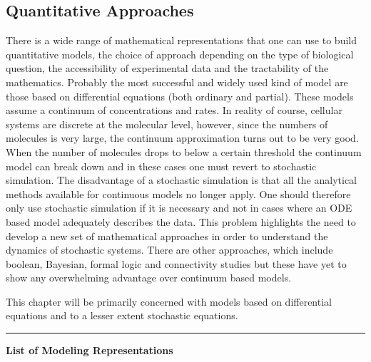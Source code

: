\subsection{Quantitative Approaches}

There is a wide range of mathematical representations that one can use
to build quantitative models, the choice of approach depending on the
type of biological question, the accessibility of experimental data and
the tractability of the mathematics. Probably the most successful and
widely used kind of model are those based on differential equations
(both ordinary and partial). These models assume a continuum of
concentrations and rates. In reality of course, cellular systems are
discrete at the molecular level, however, since the numbers of molecules
is very large, the continuum approximation turns out to be very good.
When the number of molecules drops to below a certain threshold the
continuum model can break down and in these cases one must revert to
stochastic simulation. The disadvantage of a stochastic simulation is
that all the analytical methods available for continuous models no
longer apply. One should therefore only use stochastic simulation if it
is necessary and not in cases where an ODE based model adequately
describes the data. This problem highlights the need to develop a new
set of mathematical approaches in order to understand the dynamics of
stochastic systems. There are other approaches, which include boolean,
Bayesian, formal logic and connectivity studies but these have yet to
show any overwhelming advantage over continuum based models.

This chapter will be primarily concerned with models based on
differential equations and to a lesser extent stochastic equations.

\begin{center}\rule{3in}{0.4pt}\end{center}

\textbf{List of Modeling Representations}

